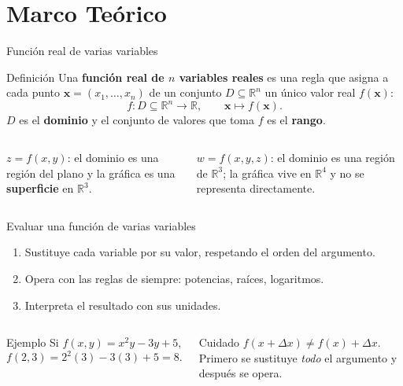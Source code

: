 \documentclass[aspectratio=169]{beamer}
\begin{document}
\section{Marco Teórico}

\begin{frame}{Función real de varias variables}
  \begin{block}{Definición}
    Una \textbf{función real de \(n\) variables reales} es una regla que asigna
    a cada punto \(\mathbf{x}=(x_1,\dots,x_n)\) de un conjunto
    \(D\subseteq\mathbb{R}^{n}\) un único valor real \(f(\mathbf{x})\):
    \[
      f:D\subseteq\mathbb{R}^{n}\longrightarrow\mathbb{R},
      \qquad \mathbf{x}\longmapsto f(\mathbf{x}).
    \]
    \(D\) es el \textbf{dominio} y el conjunto de valores que toma \(f\) es el
    \textbf{rango}.
  \end{block}
  \begin{columns}[T]
    \begin{mwextra}
      \(z=f(x,y)\): el dominio es una región del plano y la gráfica es una
      \textbf{superficie} en \(\mathbb{R}^{3}\).
    \end{mwextra}
    \begin{mwextra}
      \(w=f(x,y,z)\): el dominio es una región de \(\mathbb{R}^{3}\); la gráfica
      vive en \(\mathbb{R}^{4}\) y no se representa directamente.
    \end{mwextra}
  \end{columns}
\end{frame}

\begin{frame}{Evaluar una función de varias variables}
  \begin{mwpasos}[Procedimiento]
    \begin{enumerate}
      \item Sustituye cada variable por su valor, respetando el orden del argumento.
      \item Opera con las reglas de siempre: potencias, raíces, logaritmos.
      \item Interpreta el resultado con sus unidades.
    \end{enumerate}
  \end{mwpasos}
  \vspace{2pt}
  \begin{columns}[T]
    \begin{exampleblock}{Ejemplo}
      Si \(f(x,y)=x^{2}y-3y+5\),
      \[
        f(2,3)=2^{2}(3)-3(3)+5=8.
      \]
    \end{exampleblock}
    \begin{alertblock}{Cuidado}
      \(f(x+\Delta x)\neq f(x)+\Delta x\). Primero se sustituye \emph{todo} el
      argumento y después se opera.
    \end{alertblock}
  \end{columns}
\end{frame}
\end{document}
